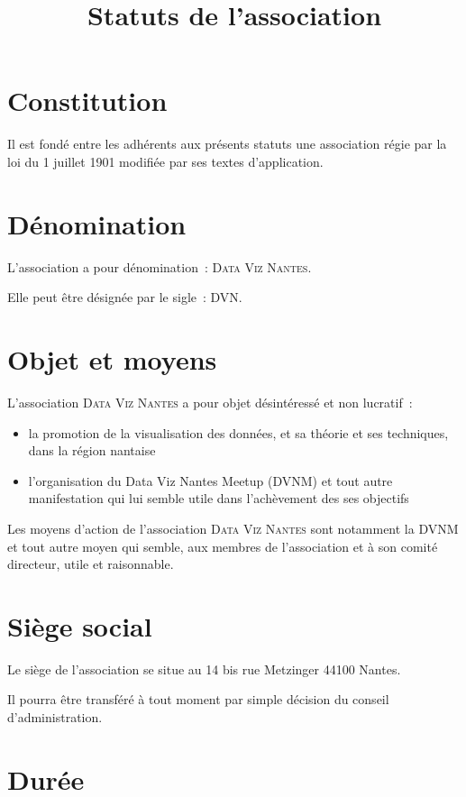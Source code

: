\documentclass[12 pt]{article}
\title{Statuts de l'association \\
  \Nom}
\date{}
\newcommand{\Nom}{\textsc{Data Viz Nantes}}
\newcommand{\Sigle}{DVN}
\begin{document}
\maketitle

\section{Constitution}
\label{sec:constitution}

Il est fondé entre les adhérents aux présents statuts une association
régie par la loi du 1\ier{} juillet 1901 modifiée par ses textes
d'application.

\section{Dénomination}
\label{sec:denomination}
L'association a pour dénomination~: \og\Nom\fg.

Elle peut être désignée par le sigle~: \og\Sigle\fg.

\section{Objet et moyens}
\label{sec:objet-et-moyens}

L'association \Nom{} a pour objet désintéressé et non lucratif~:

\begin{itemize}
\item la promotion de la visualisation des données, et sa théorie et
  ses techniques, dans la région nantaise
\item l'organisation du Data Viz Nantes Meetup (DVNM) et tout
  autre manifestation qui lui semble utile dans l'achèvement des ses objectifs
\end{itemize}

Les moyens d'action de l'association \Nom{} sont notamment la DVNM et
tout autre moyen qui semble, aux membres de l'association et à son
comité directeur, utile et raisonnable.

\section{Siège social}
\label{sec:siege-social}

Le siège de l'association se situe au 14 bis rue Metzinger 44100 Nantes.

Il pourra être transféré à tout moment par simple décision du conseil
d'administration.

\section{Durée}
\label{sec:duree}
\end{document}
